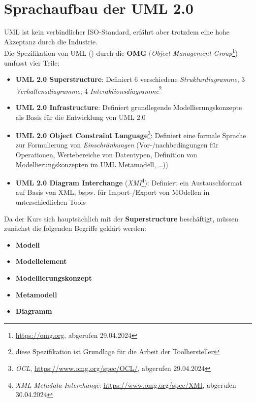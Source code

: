 \section{Sprachaufbau der UML 2.0}\label{sec:sprachaufbau-der-uml-2.0}

UML ist kein verbindlicher ISO-Standard, erfährt aber trotzdem eine hohe Akzeptanz durch die Industrie.\\

Die Spezifikation von UML (\cite{UML17}) durch die \textbf{OMG} (\textit{Object Management Group}\footnote{
    \url{https://omg.org}, abgerufen 29.04.2024
}) umfasst vier Teile:

\begin{itemize}
    \item \textbf{UML 2.0 Superstructure}: Definiert 6 verschiedene \textit{Strukturdiagramme}, 3 \textit{Verhaltensdiagramme}, 4 \textit{Interaktionsdiagramme}\footnote{
    diese Spezifikation ist Grundlage für die Arbeit der Toolhersteller
    }
    \item \textbf{UML 2.0 Infrastructure}: Definiert grundlegende Modellierungskonzepte als Basis für die Entwicklung von UML 2.0
    \item \textbf{UML 2.0 Object Constraint Language}\footnote{
    \textit{OCL}, \url{https://www.omg.org/spec/OCL/}, abgerufen 29.04.2024
    }: Definiert eine formale Sprache zur Formulierung von \textit{Einschränkungen} (Vor-/nachbedingungen für Operationen, Wertebereiche von Datentypen, Definition von Modellierungskonzepten im UML Metamodell, \ldots))
    \item \textbf{UML 2.0 Diagram Interchange} (\textit{XMI}\footnote{
    \textit{XML Metadata Interchange}: \url{https://www.omg.org/spec/XMI}, abgerufen 30.04.2024
    }): Definiert ein Austauschformat auf Basis von XML, bspw. für Import-/Export von MOdellen in unterschiedlichen Tools
\end{itemize}


\noindent
Da der Kurs sich hauptsächlich mit der \textbf{Superstructure} beschäftigt, müssen zunächst die folgenden Begriffe geklärt werden:

\begin{itemize}
    \item \textbf{Modell}
    \item \textbf{Modellelement}
    \item \textbf{Modellierungskonzept}
    \item \textbf{Metamodell}
    \item \textbf{Diagramm}
\end{itemize}

